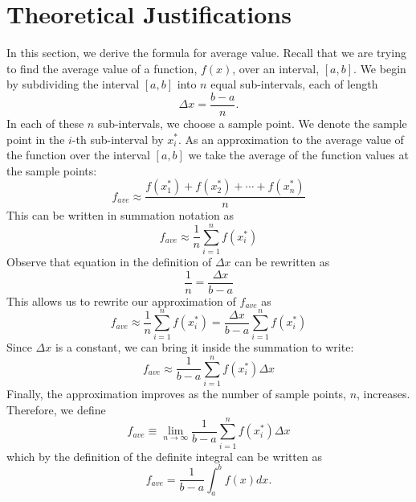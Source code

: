 \documentclass[handout]{ximera}
\begin{document}
\begin{center}
\begin{foldable}
\end{foldable}
\end{center}


\section{Theoretical Justifications}

In this section, we derive the formula for average value. Recall that we are trying to find the average value of a function, $f(x)$, over an interval, $[a,b]$.
We begin by subdividing the interval $[a,b]$ into $n$ equal sub-intervals, each of length
\[
\Delta x = \frac{b-a}{n}.
\]
In each of these $n$ sub-intervals, we choose a sample point.  We denote the sample point in the $i$-th sub-interval by $x_i^*$.
As an approximation to the average value of the function over the interval $[a,b]$ we take the average of the function values at the sample points:
\[
f_{ave} \approx \frac{f(x_1^*) + f(x_2^*)+ \cdots +f(x_n^*)}{n}
\]
This can be written in summation notation as 
\[
f_{ave} \approx \frac{1}{n} \sum_{i=1}^n f(x_i^*)
\]
Observe that equation in the definition of $\Delta x$ can be rewritten as 
\[
\frac{1}{n} = \frac{\Delta x}{b-a}
\]
This allows us to rewrite our approximation of $f_{ave}$ as
\[
f_{ave} \approx \frac{1}{n} \sum_{i=1}^n f(x_i^*) = \frac{\Delta x}{b-a} \sum_{i=1}^n f(x_i^*)
\]
Since $\Delta x$ is a constant, we can bring it inside the summation to write:
\[
f_{ave} \approx  \frac{1}{b-a} \sum_{i=1}^n f(x_i^*)\Delta x
\]
Finally, the approximation improves as the number of sample points, $n$, increases. Therefore, we define
\[
f_{ave} \equiv \lim_{n \to \infty} \frac{1}{b-a} \sum_{i=1}^n f(x_i^*)\Delta x
\]
which by the definition of the definite integral can be written as
\[
f_{ave} = \frac{1}{b-a} \int_a^b f(x) dx.
\]
\end{document}
